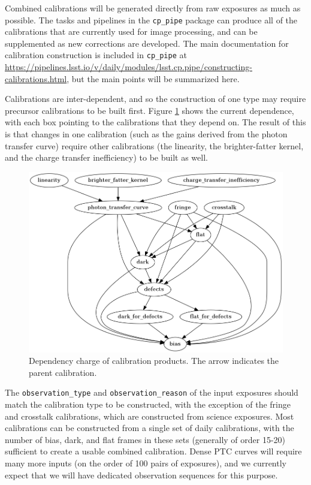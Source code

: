 \documentclass[DM,authoryear,toc]{lsstdoc}
\begin{document}
Combined calibrations will be generated directly from raw exposures as much as possible.  The tasks and pipelines in the \verb|cp_pipe| package can produce all of the calibrations that are currently used for image processing, and can be supplemented as new corrections are developed.  The main documentation for calibration construction is included in \verb|cp_pipe| at \url{https://pipelines.lsst.io/v/daily/modules/lsst.cp.pipe/constructing-calibrations.html}, but the main points will be summarized here.

Calibrations are inter-dependent, and so the construction of one type may require precursor calibrations to be built first.  Figure \ref{fig:dependence} shows the current dependence, with each box pointing to the calibrations that they depend on.  The result of this is that changes in one calibration (such as the gains derived from the photon transfer curve) require other calibrations (the linearity, the brighter-fatter kernel, and the charge transfer inefficiency) to be built as well.

\begin{figure}
  \includegraphics[width=\linewidth]{figures/dependence.png}
  \caption{Dependency charge of calibration products.  The arrow indicates the parent calibration.}
  \label{fig:dependence}
\end{figure}

The \verb|observation_type| and \verb|observation_reason| of the input exposures should match the calibration type to be constructed, with the exception of the fringe and crosstalk calibrations, which are constructed from science exposures.  Most calibrations can be constructed from a single set of daily calibrations, with the number of bias, dark, and flat frames in these sets (generally of order 15-20) sufficient to create a usable combined calibration.  Dense PTC curves will require many more inputs (on the order of 100 pairs of exposures), and we currently expect that we will have dedicated observation sequences for this purpose.
\end{document}
